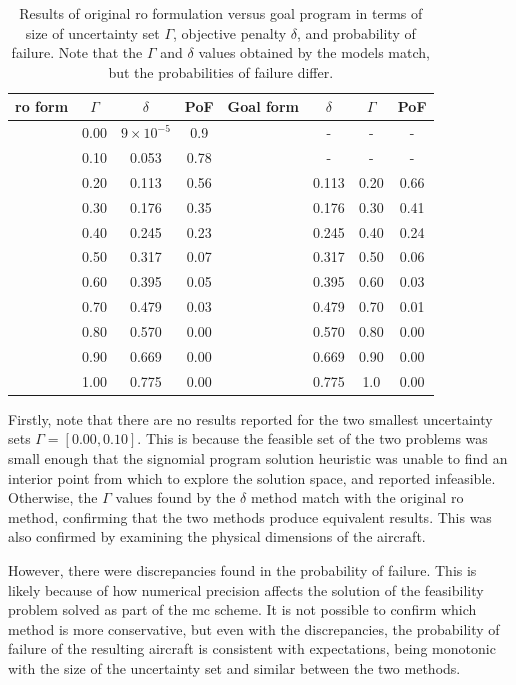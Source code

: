 \begin{table}
\begin{center}
\caption{\label{tab:deltaVsGamma} Results of original \gls{ro} formulation versus goal program in terms
of size of uncertainty set $\Gamma$, objective penalty $\delta$, and probability of failure. Note that the $\Gamma$
and $\delta$ values obtained by the models match, but the probabilities of failure differ. }
\begin{tabular}{c c c c c c c c}
\hline
 \gls{ro} form & $\Gamma$ & $\delta$ & PoF & Goal form & $\delta$ & $\Gamma$ & PoF \\
\hline
& 0.00 & $9 \times 10^{-5}$ & 0.9 & & - & - & - \\
& 0.10 & 0.053 & 0.78 & & - & - & - \\
& 0.20 & 0.113 & 0.56 & & 0.113 & 0.20 & 0.66 \\
& 0.30 & 0.176 & 0.35 & & 0.176 & 0.30 & 0.41 \\
& 0.40 & 0.245 & 0.23 & & 0.245 & 0.40 & 0.24 \\
& 0.50 & 0.317 & 0.07 & & 0.317 & 0.50 & 0.06 \\
& 0.60 & 0.395 & 0.05 & & 0.395 & 0.60 & 0.03 \\
& 0.70 & 0.479 & 0.03 & & 0.479 & 0.70 & 0.01 \\
& 0.80 & 0.570 & 0.00 & & 0.570 & 0.80 & 0.00 \\
& 0.90 & 0.669 & 0.00 & & 0.669 & 0.90 & 0.00 \\
& 1.00 & 0.775 & 0.00 & & 0.775 & 1.0 & 0.00 \\
\end{tabular}
\end{center}
\end{table}

Firstly, note that there are no results reported for the two smallest uncertainty sets $\Gamma = [0.00, 0.10]$.
This is because the feasible set of the two problems was small enough that the signomial program
solution heuristic was unable to find an interior point from which to explore the solution space, and
reported infeasible. Otherwise, the $\Gamma$ values found by the $\delta$ method match
with the original \gls{ro} method, confirming that the two methods produce equivalent results. This
was also confirmed by examining the physical dimensions of the aircraft.

However, there were discrepancies found in the probability of failure.
This is likely because of
how numerical precision affects the solution of the feasibility problem solved as part of the \gls{mc} scheme.
It is not possible to confirm which method is more conservative,
but even with the discrepancies, the probability of failure of the resulting aircraft is consistent with expectations,
being monotonic with the size of the uncertainty set and similar between the two methods.


